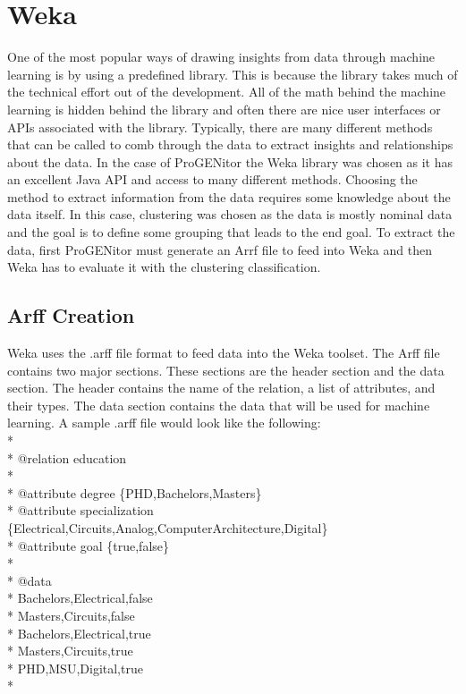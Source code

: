 \section{Weka}
\label{sect:weka}
One of the most popular ways of drawing insights from data through machine
learning is by using a predefined library.  This is because the library takes
much of the technical effort out of the development.  All of the math behind the
machine learning is hidden behind the library and often there are nice user
interfaces or APIs associated with the library.  Typically, there are many
different methods that can be called to comb through the data to extract
insights and relationships about the data.  In the case of ProGENitor the Weka
library was chosen as it has an excellent Java API and access to many different
methods.  Choosing the method to extract information from the data requires some
knowledge about the data itself.  In this case, clustering was chosen as the
data is mostly nominal data and the goal is to define some grouping that leads
to the end goal.  To extract the data, first ProGENitor must generate an
Arrf file to feed into Weka and then Weka has to evaluate it with the clustering
classification.

\subsection{Arff Creation}
Weka uses the .arff file format to feed data into the Weka toolset.  The Arff
file contains two major sections.  These sections are the header section and the
data section.\cite{arff}  The header contains the name of the relation, a list
of attributes, and their types.  The data section contains the data that will
be used for machine learning.  A sample .arff file would look like the
following:
\\*
\\*
@relation education\\*
\\*
@attribute degree \{PHD,Bachelors,Masters\}\\*
@attribute specialization
\{Electrical,Circuits,Analog,ComputerArchitecture,Digital\}\\* @attribute goal
\{true,false\}\\* \\* @data\\*
Bachelors,Electrical,false\\*
Masters,Circuits,false\\*
Bachelors,Electrical,true\\*
Masters,Circuits,true\\*
PHD,MSU,Digital,true\\*

